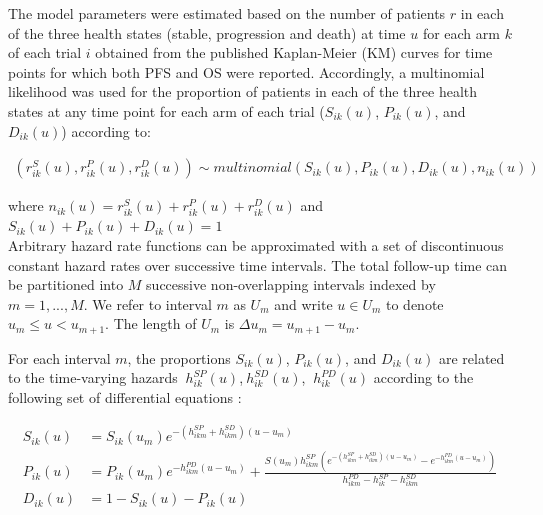 \documentclass[11pt,final,fleqn]{article}\usepackage[]{graphicx}\usepackage[]{color}
\theoremstyle{plain}
\newcounter{subsubsubsection}[subsubsection]
\begin{document}
{
The model parameters were estimated based on the number of patients $r$ in each of the three health states (stable, progression and death) at time $u$ for each arm $k$ of each trial $i$ obtained from the published Kaplan-Meier (KM) curves for time points for which both PFS and OS were reported. Accordingly, a multinomial likelihood was used for the proportion of patients in each of the three health states at any time point for each arm of each trial ($S_{ik}(u)$, $P_{ik}(u)$, and $D_{ik}(u)$) according to: 

\begin{equation} \label{eqn:multinomial_likelihood}
\begin{aligned}
(r_{ik}^{S}(u),r_{ik}^{P}(u),r_{ik}^{D}(u)) \sim multinomial(S_{ik}(u),P_{ik}(u),D_{ik}(u),n_{ik}(u))
\end{aligned}
\end{equation}

where $n_{ik}(u)=r_{ik}^{S}(u)+r_{ik}^{P}(u)+r_{ik}^{D}(u)$ and $S_{ik}(u)+P_{ik}(u)+D_{ik}(u)=1$
\\

Arbitrary hazard rate functions can be approximated with a set of discontinuous constant hazard rates over successive time intervals. The total follow-up time can be partitioned into $M$ successive non-overlapping intervals indexed by $m= 1, ..., M$. We refer to interval $m$ as $U_{m}$ and write $u \in U_{m}$ to denote $u_{m}\leq u<  u_{m+1}$. The length of $U_{m}$ is $\Delta u_{m} =u_{m+1}-u_{m}$. 

For each interval $m$, the proportions  $S_{ik}(u)$, $P_{ik}(u)$, and $D_{ik}(u)$ are related to the time-varying hazards $\ h_{ik}^{SP} (u) $,$\ h_{ik}^{SD} (u) $, $\ h_{ik}^{PD} (u)$ according to the following set of differential equations \citep{jansen2013multivariate}: 

\begin{equation} \label{eqn:diff_equations}
\begin{aligned}
S_{ik}(u) &= S_{ik}(u_{m}) e^{-(h_{ikm}^{SP}+h_{ikm}^{SD})(u-u_{m})} \\
P_{ik}(u) &= P_{ik}(u_{m}) e^{-h_{ikm}^{PD}(u-u_{m})}+\frac{S(u_{m})h_{ikm}^{SP}(e^{-(h_{ikm}^{SP}+h_{ikm}^{SD})(u-u_{m})}-e^{-h_{ikm}^{PD}(u-u_{m})})}{h_{ikm}^{PD}-h_{ik}^{SP}-h_{ikm}^{SD}} \\
D_{ik}(u) &= 1-S_{ik}(u) - P_{ik}(u) \\
\end{aligned}
\end{equation}
\\

}
\end{document}
